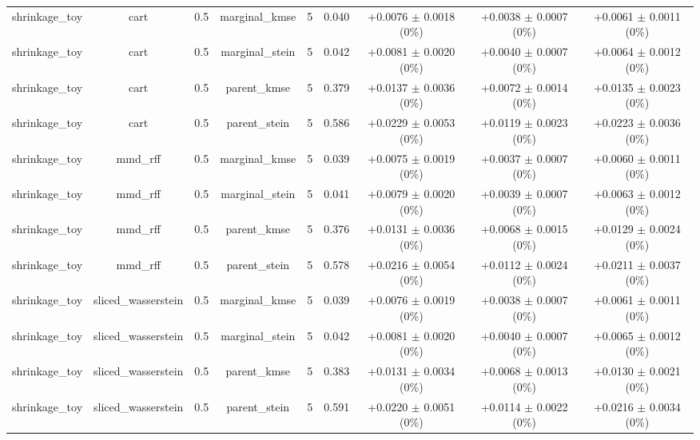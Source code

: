 \begin{table}[h]
\begin{adjustbox}{max width=\textwidth}
\begin{tabular}{lcccccccc}
    shrinkage\_toy & cart & 0.5 & marginal\_kmse & 5 & 0.040 & +0.0076 $\pm$ 0.0018 (0\%) & +0.0038 $\pm$ 0.0007 (0\%) & +0.0061 $\pm$ 0.0011 (0\%) \\
    shrinkage\_toy & cart & 0.5 & marginal\_stein & 5 & 0.042 & +0.0081 $\pm$ 0.0020 (0\%) & +0.0040 $\pm$ 0.0007 (0\%) & +0.0064 $\pm$ 0.0012 (0\%) \\
    shrinkage\_toy & cart & 0.5 & parent\_kmse & 5 & 0.379 & +0.0137 $\pm$ 0.0036 (0\%) & +0.0072 $\pm$ 0.0014 (0\%) & +0.0135 $\pm$ 0.0023 (0\%) \\
    shrinkage\_toy & cart & 0.5 & parent\_stein & 5 & 0.586 & +0.0229 $\pm$ 0.0053 (0\%) & +0.0119 $\pm$ 0.0023 (0\%) & +0.0223 $\pm$ 0.0036 (0\%) \\
    shrinkage\_toy & mmd\_rff & 0.5 & marginal\_kmse & 5 & 0.039 & +0.0075 $\pm$ 0.0019 (0\%) & +0.0037 $\pm$ 0.0007 (0\%) & +0.0060 $\pm$ 0.0011 (0\%) \\
    shrinkage\_toy & mmd\_rff & 0.5 & marginal\_stein & 5 & 0.041 & +0.0079 $\pm$ 0.0020 (0\%) & +0.0039 $\pm$ 0.0007 (0\%) & +0.0063 $\pm$ 0.0012 (0\%) \\
    shrinkage\_toy & mmd\_rff & 0.5 & parent\_kmse & 5 & 0.376 & +0.0131 $\pm$ 0.0036 (0\%) & +0.0068 $\pm$ 0.0015 (0\%) & +0.0129 $\pm$ 0.0024 (0\%) \\
    shrinkage\_toy & mmd\_rff & 0.5 & parent\_stein & 5 & 0.578 & +0.0216 $\pm$ 0.0054 (0\%) & +0.0112 $\pm$ 0.0024 (0\%) & +0.0211 $\pm$ 0.0037 (0\%) \\
    shrinkage\_toy & sliced\_wasserstein & 0.5 & marginal\_kmse & 5 & 0.039 & +0.0076 $\pm$ 0.0019 (0\%) & +0.0038 $\pm$ 0.0007 (0\%) & +0.0061 $\pm$ 0.0011 (0\%) \\
    shrinkage\_toy & sliced\_wasserstein & 0.5 & marginal\_stein & 5 & 0.042 & +0.0081 $\pm$ 0.0020 (0\%) & +0.0040 $\pm$ 0.0007 (0\%) & +0.0065 $\pm$ 0.0012 (0\%) \\
    shrinkage\_toy & sliced\_wasserstein & 0.5 & parent\_kmse & 5 & 0.383 & +0.0131 $\pm$ 0.0034 (0\%) & +0.0068 $\pm$ 0.0013 (0\%) & +0.0130 $\pm$ 0.0021 (0\%) \\
    shrinkage\_toy & sliced\_wasserstein & 0.5 & parent\_stein & 5 & 0.591 & +0.0220 $\pm$ 0.0051 (0\%) & +0.0114 $\pm$ 0.0022 (0\%) & +0.0216 $\pm$ 0.0034 (0\%) \\
    \bottomrule
  \end{tabular}
  \end{adjustbox}
\end{table}

